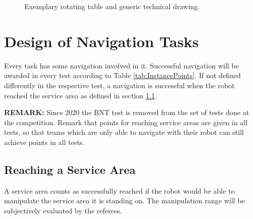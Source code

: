 \begin{figure}[h!]
	\centering
	\caption{Exemplary rotating table and generic technical drawing.}%
	\label{fig:rottable}
\end{figure}


\section{Design of Navigation Tasks} \label{sec:NavigationTasks}
Every task has some navigation involved in it. Successful navigation will be awarded in every test according to Table \ref{tab:InstancePoints}. If not defined differently in the respective test, a navigation is successful when the robot reached the service area as defined in section \ref{ssec:Navigating}. 

\textbf{REMARK:} Since 2020 the BNT test is removed from the set of tests done at the competition. Remark that points for reaching service areas are given in all tests, so that teams which are only able to navigate with their robot can still achieve points in all tests.


\subsection{Reaching a Service Area} \label{ssec:Navigating}
A service area counts as successfully reached if the robot would be able to manipulate the service area it is standing on. The manipulation range will be subjectively evaluated by the referees.


